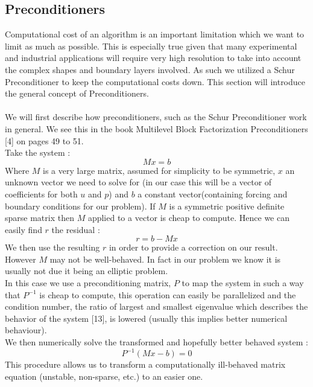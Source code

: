 \documentclass[11pt,twoside,a4paper]{article}
\begin{document}
\subsection{Preconditioners}
Computational cost of an algorithm is an important limitation which we want to limit as much as possible. This is especially true given that many experimental and industrial applications will require very high resolution to take into account the complex shapes and boundary layers involved. As such we utilized a Schur Preconditioner to keep the computational costs down. This section will introduce the general concept of Preconditioners.\\
\\
We will first describe how preconditioners, such as the Schur Preconditioner work in general. We see this in the book Multilevel Block Factorization Preconditioners [4] on pages 49 to 51.\\
Take the system :\\
$$
Mx = b
$$
Where $M$ is a very large matrix, assumed for simplicity to be symmetric, $x$ an unknown vector we need to solve for (in our case this will be a vector of coefficients for both $u$ and $p$) and $b$ a constant vector(containing forcing and boundary conditions for our problem). If $M$ is a symmetric positive definite sparse matrix then $M$ applied to a vector is cheap to compute. Hence we can easily find $r$ the residual :\\
$$
r = b - Mx
$$
We then use the resulting $r$ in order to provide a correction on our result.\\
However $M$ may not be well-behaved. In fact in our problem we know it is usually not due it being an elliptic problem.\\
In this case we use a preconditioning matrix, $P$ to map the system in such a way that $P^{-1}$ is cheap to compute, this operation can easily be parallelized and the condition number, the ratio of largest and smallest eigenvalue which describes the behavior of the system [13], is lowered (usually this implies better numerical behaviour).\\
We then numerically solve the transformed and hopefully better behaved system :
$$
P^{-1}(Mx-b) = 0
$$
This procedure allows us to transform a computationally ill-behaved matrix equation (unstable, non-sparse, etc.) to an easier one.
\end{document}
